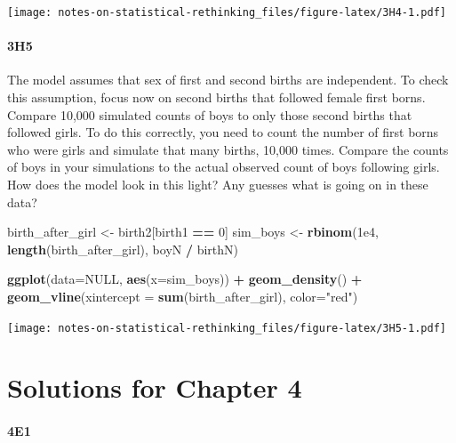 \documentclass[
]{book}
\newenvironment{Shaded}{\begin{snugshade}}{\end{snugshade}}
\newcommand{\DataTypeTok}[1]{\textcolor[rgb]{0.13,0.29,0.53}{#1}}
\newcommand{\DecValTok}[1]{\textcolor[rgb]{0.00,0.00,0.81}{#1}}
\newcommand{\FloatTok}[1]{\textcolor[rgb]{0.00,0.00,0.81}{#1}}
\newcommand{\KeywordTok}[1]{\textcolor[rgb]{0.13,0.29,0.53}{\textbf{#1}}}
\newcommand{\NormalTok}[1]{#1}
\newcommand{\OperatorTok}[1]{\textcolor[rgb]{0.81,0.36,0.00}{\textbf{#1}}}
\newcommand{\OtherTok}[1]{\textcolor[rgb]{0.56,0.35,0.01}{#1}}
\newcommand{\StringTok}[1]{\textcolor[rgb]{0.31,0.60,0.02}{#1}}
\begin{document}
\texttt{[image: notes-on-statistical-rethinking\_files/figure-latex/3H4-1.pdf]}

\hypertarget{h5}{%
\subsubsection*{3H5}\label{h5}}

The model assumes that sex of first and second births are independent. To check this assumption, focus now on second births that followed female first borns. Compare 10,000 simulated counts of boys to only those second births that followed girls. To do this correctly, you need to count the number of first borns who were girls and simulate that many births, 10,000 times. Compare the counts of boys in your simulations to the actual observed count of boys following girls. How does the model look in this light? Any guesses what is going on in these data?

\begin{Shaded}
\begin{Highlighting}[]
\NormalTok{birth\_after\_girl \textless{}{-}}\StringTok{ }\NormalTok{birth2[birth1 }\OperatorTok{==}\StringTok{ }\DecValTok{0}\NormalTok{]}
\NormalTok{sim\_boys \textless{}{-}}\StringTok{ }\KeywordTok{rbinom}\NormalTok{(}\FloatTok{1e4}\NormalTok{, }\KeywordTok{length}\NormalTok{(birth\_after\_girl), boyN }\OperatorTok{/}\StringTok{ }\NormalTok{birthN)}

\KeywordTok{ggplot}\NormalTok{(}\DataTypeTok{data=}\OtherTok{NULL}\NormalTok{, }\KeywordTok{aes}\NormalTok{(}\DataTypeTok{x=}\NormalTok{sim\_boys)) }\OperatorTok{+}\StringTok{ }
\StringTok{  }\KeywordTok{geom\_density}\NormalTok{() }\OperatorTok{+}\StringTok{ }
\StringTok{  }\KeywordTok{geom\_vline}\NormalTok{(}\DataTypeTok{xintercept =} \KeywordTok{sum}\NormalTok{(birth\_after\_girl), }\DataTypeTok{color=}\StringTok{"red"}\NormalTok{)}
\end{Highlighting}
\end{Shaded}

\texttt{[image: notes-on-statistical-rethinking\_files/figure-latex/3H5-1.pdf]}

\hypertarget{solutions-for-chapter-4}{%
\chapter{Solutions for Chapter 4}\label{solutions-for-chapter-4}}

\hypertarget{e1-2}{%
\subsubsection*{4E1}\label{e1-2}}
\end{document}
